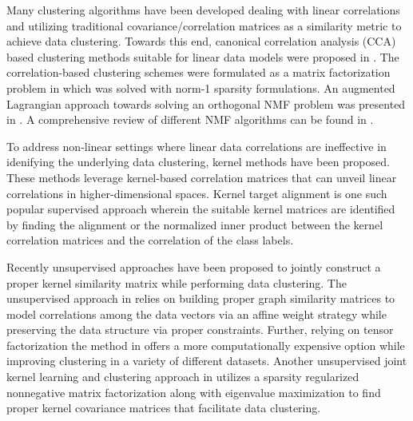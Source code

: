 \documentclass[10pt,final]{IEEEtran}
\begin{document}
Many clustering algorithms have been developed dealing with linear correlations and utilizing traditional covariance/correlation matrices as a similarity metric to achieve data clustering.  Towards this end, canonical correlation analysis (CCA) based clustering methods  suitable for linear data models were proposed in \cite{CCA}. The correlation-based clustering schemes were formulated as a matrix factorization problem in \cite{Distributed Informative-Sensor} which was solved with norm-1 sparsity formulations. An augmented Lagrangian approach towards solving an orthogonal NMF problem was presented in \cite{Neurocomputing}. A comprehensive review of different NMF algorithms can be found in \cite{NNMF Comprehensive}.

To address non-linear settings  where linear data correlations are ineffective in idenifying the underlying data clustering, kernel methods have been proposed.  These methods leverage kernel-based correlation matrices that can unveil linear correlations in higher-dimensional spaces. Kernel target alignment \cite{Kernel_Target} is one such popular supervised approach wherein the suitable kernel matrices are identified by finding the alignment or the normalized inner product between the kernel correlation matrices and the correlation of the class labels. 

Recently unsupervised approaches have been proposed to jointly construct a proper kernel similarity matrix while performing data clustering. The unsupervised approach in \cite{SPMKC} relies on building proper graph similarity matrices to model correlations among the data vectors via an affine weight strategy while preserving the data structure via proper constraints. Further, relying on tensor factorization the method in \cite{tkmgc} offers a more computationally expensive option while improving clustering in a variety of different datasets. Another unsupervised joint kernel learning and clustering approach in \cite{DCA} utilizes a sparsity regularized nonnegative matrix factorization along with eigenvalue maximization to find proper kernel covariance matrices that facilitate data clustering.
\end{document}
